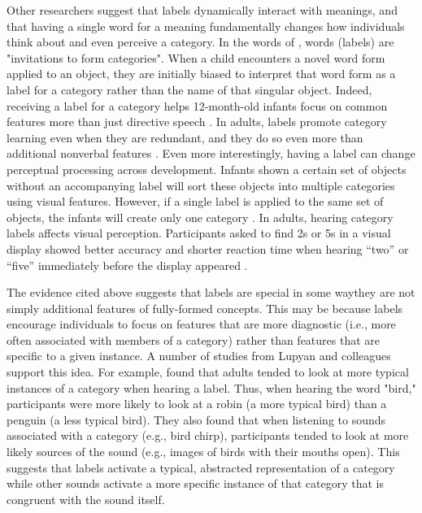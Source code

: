 \documentclass[../dissertation.tex]{subfiles}
\begin{document}
	Other researchers suggest that labels dynamically interact with meanings, and that having a single word for a meaning fundamentally changes how individuals think about and even perceive a category. In the words of \citet{Waxman1995}, words (labels) are "invitations to form categories". When a child encounters a novel word form applied to an object, they are initially biased to interpret that word form as a label for a category rather than the name of that singular object. Indeed, receiving a label for a category helps 12-month-old infants focus on common features more than just directive speech \citep{Althaus2014}. In adults, labels promote category learning even when they are redundant, and they do so even more than additional nonverbal features \citep{Lupyan2007}. Even more interestingly, having a label can change perceptual processing across development. Infants shown a certain set of objects without an accompanying label will sort these objects into multiple categories using visual features. However, if a single label is applied to the same set of objects, the infants will create only one category \citep{Plunkett2008}. In adults, hearing category labels affects visual perception. Participants asked to find 2s or 5s in a visual display showed better accuracy and shorter reaction time when hearing “two” or “five” immediately before the display appeared \citep{Lupyan2010}.  \par
	The evidence cited above suggests that labels are special in some way\textemdash they are not simply additional features of fully-formed concepts. This may be because labels encourage individuals to focus on features that are more diagnostic (i.e., more often associated with members of a category) rather than features that are specific to a given instance. A number of studies from Lupyan and colleagues support this idea. For example, \citet{Edmiston2015} found that adults tended to look at more typical instances of a category when hearing a label. Thus, when hearing the word "bird," participants were more likely to look at a robin (a more typical bird) than a penguin (a less typical bird). They also found that when listening to sounds associated with a category (e.g., bird chirp), participants tended to look at more likely sources of the sound (e.g., images of birds with their mouths open). This suggests that labels activate a typical, abstracted representation of a category while other sounds activate a more specific instance of that category that is congruent with the sound itself. \par
\end{document}
